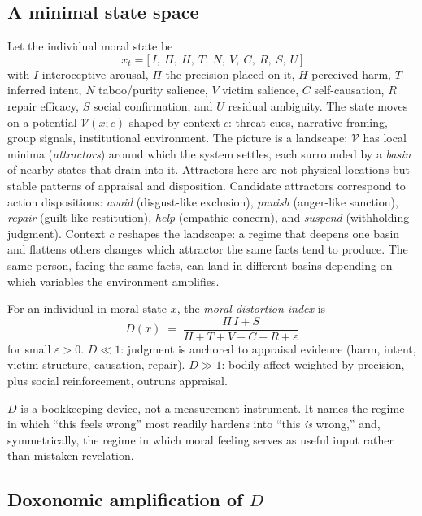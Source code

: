 \subsection{A minimal state space}

Let the individual moral state be
\[
  x_t = \bigl[\,I,\ \Pi,\ H,\ T,\ N,\ V,\ C,\ R,\ S,\ U\,\bigr]
\]
with $I$ interoceptive arousal, $\Pi$ the precision placed on it, $H$ perceived harm, $T$ inferred intent, $N$ taboo/purity salience, $V$ victim salience, $C$ self-causation, $R$ repair efficacy, $S$ social confirmation, and $U$ residual ambiguity.
The state moves on a potential $\mathcal{V}(x; c)$ shaped by context $c$: threat cues, narrative framing, group signals, institutional environment.
The picture is a landscape: $\mathcal{V}$ has local minima (\emph{attractors}) around which the system settles, each surrounded by a \emph{basin} of nearby states that drain into it.
Attractors here are not physical locations but stable patterns of appraisal and disposition.
Candidate attractors correspond to action dispositions: \emph{avoid} (disgust-like exclusion), \emph{punish} (anger-like sanction), \emph{repair} (guilt-like restitution), \emph{help} (empathic concern), and \emph{suspend} (withholding judgment).
Context $c$ reshapes the landscape: a regime that deepens one basin and flattens others changes which attractor the same facts tend to produce.
The same person, facing the same facts, can land in different basins depending on which variables the environment amplifies.

\begin{definition}
\label{def:moral-distortion}
For an individual in moral state $x$, the \emph{moral distortion index} is
\[
  D(x) \;=\; \frac{\Pi\,I + S}{H + T + V + C + R + \varepsilon}
\]
for small $\varepsilon > 0$.
$D \ll 1$: judgment is anchored to appraisal evidence (harm, intent, victim structure, causation, repair).
$D \gg 1$: bodily affect weighted by precision, plus social reinforcement, outruns appraisal.
\end{definition}

$D$ is a bookkeeping device, not a measurement instrument.
It names the regime in which ``this feels wrong'' most readily hardens into ``this \emph{is} wrong,'' and, symmetrically, the regime in which moral feeling serves as useful input rather than mistaken revelation.

\subsection{Doxonomic amplification of \texorpdfstring{$D$}{D}}

